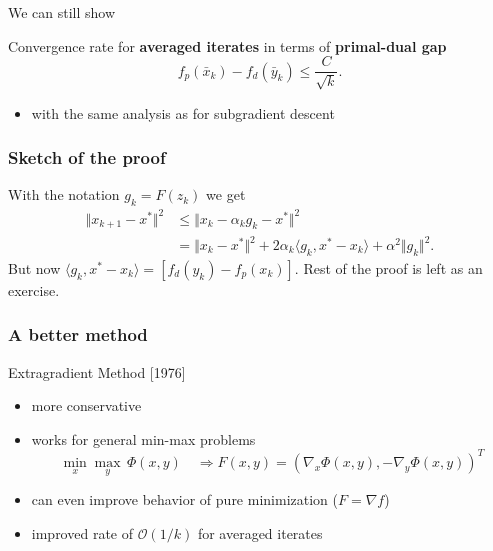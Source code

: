 \documentclass[aspectratio=149]{beamer}
\begin{document}
\begin{frame}
  \frametitle{}

We can still show
  \begin{theorem}
    Convergence rate for \textbf{averaged iterates} in terms of \textbf{primal-dual gap}
    \begin{equation}
      f_p(\bar{x}_k) - f_d(\bar{y}_k) \le \frac{C}{ \sqrt{k}}.
    \end{equation}
  \end{theorem}

  \begin{itemize}
    \item with the same analysis as for subgradient descent
  \end{itemize}
\end{frame}

\begin{frame}
  \frametitle{Sketch of the proof}
  With the notation $g_k = F(z_k)$ we get
  \begin{equation}
    \begin{aligned}
      \Vert x_{k+1} - x^* \Vert^2 &\le \Vert x_k - \alpha_k g_k - x^* \Vert^2 \\
      &= \Vert x_k-x^* \Vert^2 + 2 \alpha_k \langle g_k, x^*-x_k \rangle + \alpha^2 \Vert g_k \Vert^2.
    \end{aligned}
  \end{equation}
  But now $\langle g_k, x^* - x_k \rangle = [f_d(y_k) - f_p(x_k)]$.
  Rest of the proof is left as an exercise.
\end{frame}


\begin{frame}
  \frametitle{A better method}

  \begin{algorithm}[H]
    \caption{Extragradient Method [1976]}
    \begin{algorithmic}[1]
      \EndFor{}
    \end{algorithmic}
  \end{algorithm}

  \begin{itemize}
    \item more conservative
    \item works for general min-max problems
          \begin{equation}
            \min_x \max_y \, \Phi(x,y) \quad \Rightarrow F(x,y) = {(\nabla_x \Phi(x,y), - \nabla_y \Phi(x,y))}^T
          \end{equation}
    \item can even improve behavior of pure minimization ($F = \nabla f$)
    \item improved rate of $\mathcal{O}(1/k)$ for averaged iterates
  \end{itemize}
\end{frame}
\end{document}
